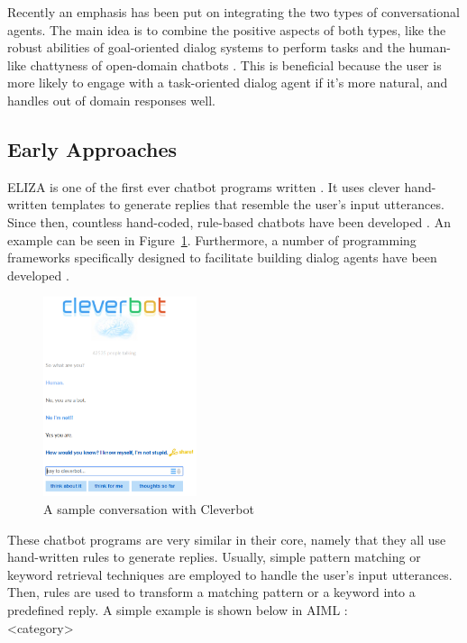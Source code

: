 \documentclass[12pt]{article}
\begin{document}
Recently an emphasis has been put on integrating the two types of conversational agents. The main idea is to combine the positive aspects of both types, like the robust abilities of goal-oriented dialog systems to perform tasks and the human-like chattyness of open-domain chatbots \cite{Zhao:2017,Yu:2017,Serban:2017}. This is beneficial because the user is more likely to engage with a task-oriented dialog agent if it's more natural, and handles out of domain responses well.

\subsection{Early Approaches} \label{ssec:22}

ELIZA is one of the first ever chatbot programs written \cite{Weizenbaum:1966}. It uses clever hand-written templates to generate replies that resemble the user's input utterances. Since then, countless hand-coded, rule-based chatbots have been developed \cite{Wallace:2009,Cleverbot:2017,Mitsuku:2017}. An example can be seen in Figure~\ref{fig:22a}. Furthermore, a number of programming frameworks specifically designed to facilitate building dialog agents have been developed \cite{Marietto:2013,Microsoft:2017}.

\begin{figure}[H]
	\centering
	\includegraphics[width=0.4\textwidth]{pics/cleverbot.png}
	\caption{A sample conversation with Cleverbot \cite{Cleverbot:2017}}
	\label{fig:22a}
\end{figure}


These chatbot programs are very similar in their core, namely that they all use hand-written rules to generate replies. Usually, simple pattern matching or keyword retrieval techniques are employed to handle the user's input utterances. Then, rules are used to transform a matching pattern or a keyword into a predefined reply.
A simple example is shown below in AIML \cite{Marietto:2013}:\\
{\color{OliveGreen}\textless category\textgreater}
\end{document}
